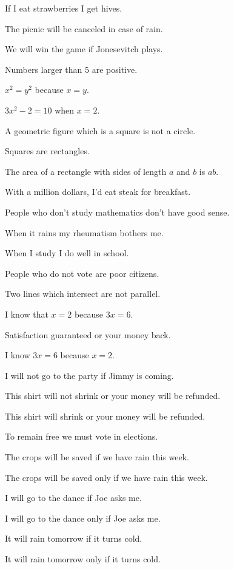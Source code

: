 \documentclass[11pt]{book}
\theoremstyle{bkplain}
\theoremstyle{XIplainnote}
\theoremstyle{bkplain}
\theoremstyle{bkplain}
\begin{document}
\begin{exercisecols}
\begin{exlist}
\item If I eat strawberries I get hives.
\item The picnic will be canceled in case of rain.
\item We will win the game if Jonesevitch plays.
\item Numbers larger than 5 are positive.
\item $x^2 = y^2$ because $x = y$.
\item $3x^2 - 2 = 10$ when $x = 2$.
\item A geometric figure which is a square is not a circle.
\item Squares are rectangles.
\item The area of a rectangle with sides of length $a$ and $b$ is $ab$.
\item With a million dollars, I'd eat steak for breakfast.
\item People who don't study mathematics don't have good sense.
\item When it rains my rheumatism bothers me.
\item When I study I do well in school.
\item People who do not vote are poor citizens.
\item Two lines which intersect are not parallel.
\item I know that $x = 2$ because $3x = 6$.
\item Satisfaction guaranteed or your money back.
\item I know $3x = 6$ because $x = 2$.
\item I will not go to the party if Jimmy is coming.
\item This shirt will not shrink or your money will be refunded.
\item This shirt will shrink or your money will be refunded.
\item To remain free we must vote in elections.
\item The crops will be saved if we have rain this week.
\item The crops will be saved only if we have rain this week.
\item I will go to the dance if Joe asks me.
\item I will go to the dance only if Joe asks me.
\item It will rain tomorrow if it turns cold.
\item It will rain tomorrow only if it turns cold.
\end{exlist}
\end{exercisecols}
\end{document}
